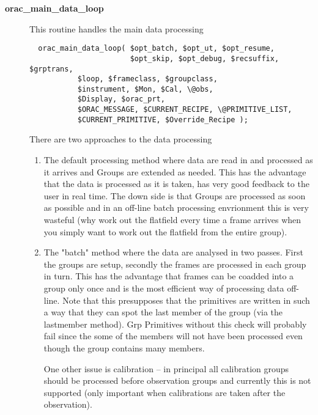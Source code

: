\begin{description}
\item[{\textbf{orac\_main\_data\_loop}}] \mbox{}

This routine handles the main data processing

\begin{verbatim}
  orac_main_data_loop( $opt_batch, $opt_ut, $opt_resume, 
                       $opt_skip, $opt_debug, $recsuffix, $grptrans,
           $loop, $frameclass, $groupclass, 
           $instrument, $Mon, $Cal, \@obs, 
           $Display, $orac_prt,
           $ORAC_MESSAGE, $CURRENT_RECIPE, \@PRIMITIVE_LIST,
           $CURRENT_PRIMITIVE, $Override_Recipe );
\end{verbatim}


There are two approaches to the data processing

\begin{enumerate}

\item 

The default processing method where data are read in and processed as
it arrives and Groups are extended as needed. This has the advantage
that the data is processed as it is taken, has very good feedback to
the user in real time. The down side is that Groups are processed as
soon as possible and in an off-line batch processing envrionment this
is very wasteful (why work out the flatfield every time a frame
arrives when you simply want to work out the flatfield from the entire
group).


\item 

The "batch" method where the data are analysed in two passes.  First
the groups are setup, secondly the frames are processed in each group
in turn. This has the advantage that frames can be coadded into a
group only once and is the most efficient way of processing data
off-line. Note that this presupposes that the primitives are written
in such a way that they can spot the last member of the group (via the
lastmember method). Grp Primitives without this check will probably
fail since the some of the members will not have been processed even
though the group contains many members.



One other issue is calibration -- in principal all calibration groups
should be processed before observation groups and currently this is
not supported (only important when calibrations are taken after the
observation).




\end{enumerate}
\end{description}
